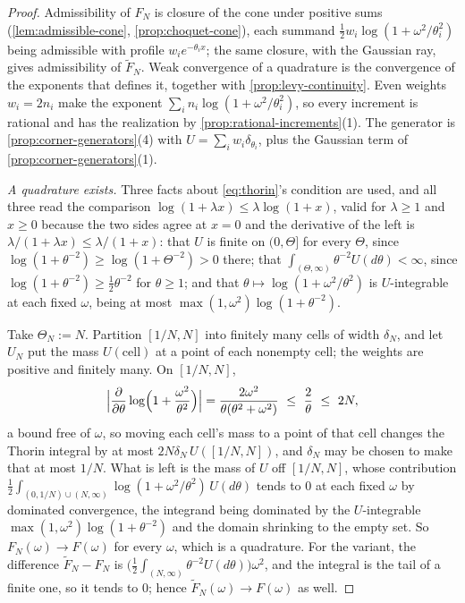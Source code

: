 \begin{proof}
Admissibility of $F_N$ is closure of the cone under positive sums
(\ref{lem:admissible-cone}, \ref{prop:choquet-cone}), each summand
$\tfrac12 w_i\log(1+\omega^2/\theta_i^2)$ being admissible with profile $w_ie^{-\theta_ix}$; the
same closure, with the Gaussian ray, gives admissibility of $\tilde F_N$. Weak
convergence of a quadrature is the convergence of the exponents that defines it, together with
\ref{prop:levy-continuity}. Even weights $w_i = 2n_i$ make the exponent
$\sum_i n_i\log(1+\omega^2/\theta_i^2)$, so every increment is rational and has the
realization by \ref{prop:rational-increments}(1). The generator is
\ref{prop:corner-generators}(4) with $U = \sum_i w_i\delta_{\theta_i}$, plus the Gaussian term
of \ref{prop:corner-generators}(1).

\emph{A quadrature exists.} Three facts about \ref{eq:thorin}'s condition are used, and all three
read the comparison $\log(1 + \lambda x) \le \lambda\log(1 + x)$, valid for $\lambda \ge 1$ and
$x \ge 0$ because the two sides agree at $x = 0$ and the derivative of the left is
$\lambda/(1+\lambda x) \le \lambda/(1+x)$: that $U$ is finite on $(0,\Theta]$ for every $\Theta$,
since $\log(1+\theta^{-2}) \ge \log(1+\Theta^{-2}) > 0$ there; that
$\int_{(\Theta,\infty)}\theta^{-2}U(d\theta) < \infty$, since
$\log(1+\theta^{-2}) \ge \tfrac12\theta^{-2}$ for $\theta \ge 1$; and that
$\theta \mapsto \log(1+\omega^2/\theta^2)$ is $U$-integrable at each fixed $\omega$, being at most
$\max(1,\omega^2)\log(1+\theta^{-2})$.

Take $\Theta_N := N$. Partition $[1/N, N]$ into finitely many cells of width $\delta_N$, and let
$U_N$ put the mass $U(\text{cell})$ at a point of each nonempty cell; the weights are positive and
finitely many. On $[1/N,N]$,
\[
  \Bigl|\frac{\partial}{\partial\theta}\log\Bigl(1 + \frac{\omega^2}{\theta^2}\Bigr)\Bigr|
   = \frac{2\omega^2}{\theta(\theta^2+\omega^2)} \ \le\ \frac 2\theta \ \le\ 2N ,
\]
a bound free of $\omega$, so moving each cell's mass to a point of that cell changes the Thorin
integral by at most $2N\delta_N\,U([1/N,N])$, and $\delta_N$ may be chosen to make that at most
$1/N$. What is left is the mass of $U$ off $[1/N,N]$, whose contribution
$\tfrac12\int_{(0,1/N)\cup(N,\infty)}\log(1+\omega^2/\theta^2)\,U(d\theta)$ tends to $0$ at each
fixed $\omega$ by dominated convergence, the integrand being dominated by the $U$-integrable
$\max(1,\omega^2)\log(1+\theta^{-2})$ and the domain shrinking to the empty set. So
$F_N(\omega) \to F(\omega)$ for every $\omega$, which is a quadrature. For the variant, the
difference $\tilde F_N - F_N$ is
$\bigl(\tfrac12\int_{(N,\infty)}\theta^{-2}U(d\theta)\bigr)\omega^2$, and the integral is the tail
of a finite one, so it tends to $0$; hence $\tilde F_N(\omega) \to F(\omega)$ as well.
\end{proof}

